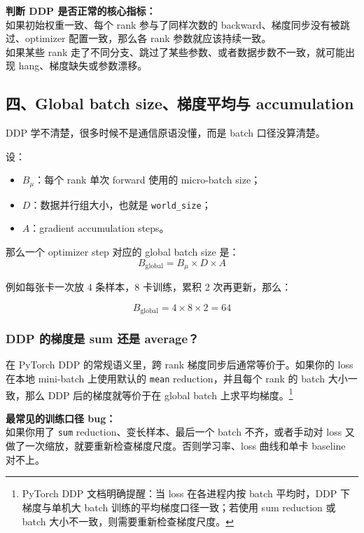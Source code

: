 \begin{warnbox}
\textbf{判断 DDP 是否正常的核心指标：}\\
如果初始权重一致、每个 rank 参与了同样次数的 backward、梯度同步没有被跳过、optimizer 配置一致，那么各 rank 参数就应该持续一致。\\
如果某些 rank 走了不同分支、跳过了某些参数、或者数据步数不一致，就可能出现 hang、梯度缺失或参数漂移。
\end{warnbox}

\subsection{四、Global batch size、梯度平均与 accumulation}

DDP 学不清楚，很多时候不是通信原语没懂，而是 batch 口径没算清楚。

\begin{conceptbox}
设：
\begin{itemize}[leftmargin=1.5em]
  \item $B_{\mu}$：每个 rank 单次 forward 使用的 micro-batch size；
  \item $D$：数据并行组大小，也就是 \texttt{world\_size}；
  \item $A$：gradient accumulation steps。
\end{itemize}
那么一个 optimizer step 对应的 global batch size 是：
\[
B_{\text{global}} = B_{\mu} \times D \times A
\]
\end{conceptbox}

例如每张卡一次放 4 条样本，8 卡训练，累积 2 次再更新，那么：

\[
B_{\text{global}} = 4 \times 8 \times 2 = 64
\]

\subsubsection*{DDP 的梯度是 sum 还是 average？}

在 PyTorch DDP 的常规语义里，跨 rank 梯度同步后通常等价于。如果你的 loss 在本地 mini-batch 上使用默认的 \texttt{mean} reduction，并且每个 rank 的 batch 大小一致，那么 DDP 后的梯度就等价于在 global batch 上求平均梯度。\footnote{PyTorch DDP 文档明确提醒：当 loss 在各进程内按 batch 平均时，DDP 下梯度与单机大 batch 训练的平均梯度口径一致；若使用 sum reduction 或 batch 大小不一致，则需要重新检查梯度尺度。}

\begin{warnbox}
\textbf{最常见的训练口径 bug：}\\
如果你用了 \texttt{sum} reduction、变长样本、最后一个 batch 不齐，或者手动对 loss 又做了一次缩放，就要重新检查梯度尺度。否则学习率、loss 曲线和单卡 baseline 对不上。
\end{warnbox}

